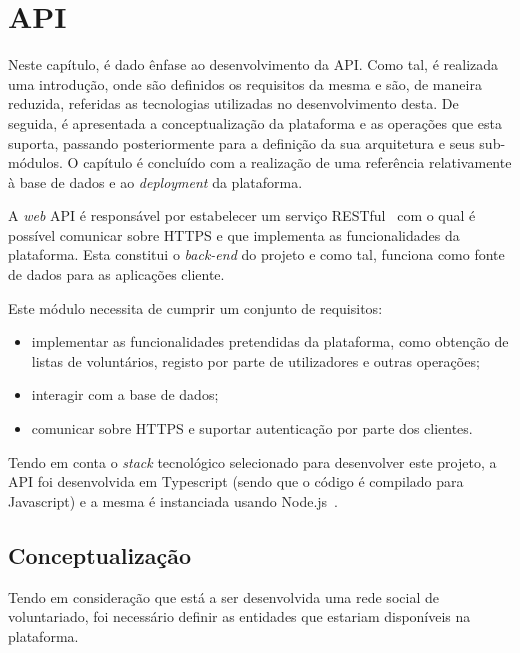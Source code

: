 \section{API}

Neste capítulo, é dado ênfase ao desenvolvimento da API. Como tal, é realizada uma introdução, onde são definidos os requisitos da mesma e são, de maneira reduzida, referidas as tecnologias utilizadas no desenvolvimento desta. De seguida, é apresentada a conceptualização da plataforma e as operações que esta suporta, passando posteriormente para a definição da sua arquitetura e seus sub-módulos. O capítulo é concluído com a realização de uma referência relativamente à base de dados e ao \textit{deployment} da plataforma.

\medskip \par

A \textit{web} API é responsável por estabelecer um serviço RESTful~\cite{Fielding2000} com o qual é possível comunicar sobre HTTPS e que implementa as funcionalidades da plataforma. Esta constitui o \textit{back-end} do projeto e como tal, funciona como fonte de dados para as aplicações cliente.

\medskip \par

Este módulo necessita de cumprir um conjunto de requisitos:

\begin{itemize}
	\item implementar as funcionalidades pretendidas da plataforma, como obtenção de listas de voluntários, registo por parte de utilizadores e outras operações;
	\item interagir com a base de dados;
	\item comunicar sobre HTTPS e suportar autenticação por parte dos clientes.
\end{itemize}

\medskip \par

Tendo em conta o \textit{stack} tecnológico selecionado para desenvolver este projeto, a API foi  desenvolvida em Typescript (sendo que o código é compilado para Javascript) e a mesma é instanciada usando Node.js~\cite{Wilson2018}.

\subsection{Conceptualização}

Tendo em consideração que está a ser desenvolvida uma rede social de voluntariado, foi necessário definir as entidades que estariam disponíveis na plataforma. 


